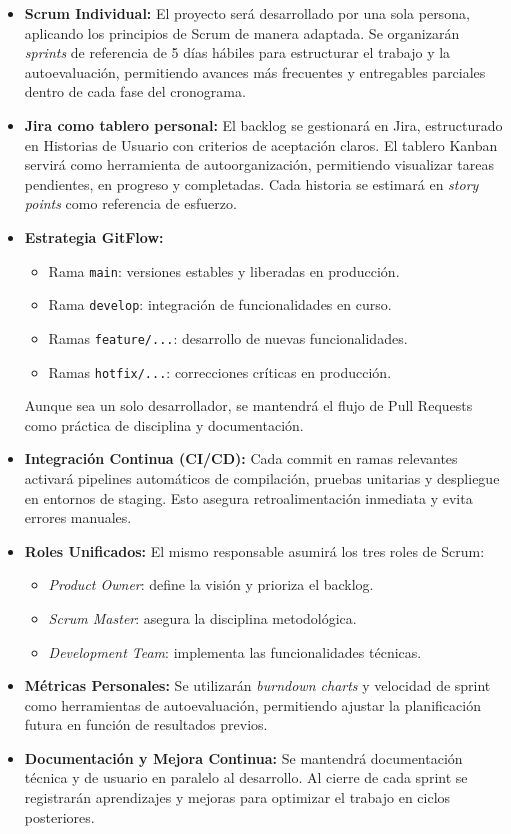 \documentclass[11pt,a4paper]{article}
\begin{document}
	\begin{itemize}
		\item \textbf{Scrum Individual:} El proyecto será desarrollado por una sola persona, aplicando los principios de Scrum de manera adaptada. Se organizarán \textit{sprints} de referencia de 5 días hábiles para estructurar el trabajo y la autoevaluación, permitiendo avances más frecuentes y entregables parciales dentro de cada fase del cronograma.
		
		\item \textbf{Jira como tablero personal:} El backlog se gestionará en Jira, estructurado en Historias de Usuario con criterios de aceptación claros. El tablero Kanban servirá como herramienta de autoorganización, permitiendo visualizar tareas pendientes, en progreso y completadas. Cada historia se estimará en \textit{story points} como referencia de esfuerzo.
		
		\item \textbf{Estrategia GitFlow:} 
		\begin{itemize}
			\item Rama \texttt{main}: versiones estables y liberadas en producción.
			\item Rama \texttt{develop}: integración de funcionalidades en curso.
			\item Ramas \texttt{feature/...}: desarrollo de nuevas funcionalidades.
			\item Ramas \texttt{hotfix/...}: correcciones críticas en producción.
		\end{itemize}
		Aunque sea un solo desarrollador, se mantendrá el flujo de Pull Requests como práctica de disciplina y documentación.
		
		\item \textbf{Integración Continua (CI/CD):} Cada commit en ramas relevantes activará pipelines automáticos de compilación, pruebas unitarias y despliegue en entornos de staging. Esto asegura retroalimentación inmediata y evita errores manuales.
		
		\item \textbf{Roles Unificados:} El mismo responsable asumirá los tres roles de Scrum:
		\begin{itemize}
			\item \textit{Product Owner}: define la visión y prioriza el backlog.
			\item \textit{Scrum Master}: asegura la disciplina metodológica.
			\item \textit{Development Team}: implementa las funcionalidades técnicas.
		\end{itemize}
		
		\item \textbf{Métricas Personales:} Se utilizarán \textit{burndown charts} y velocidad de sprint como herramientas de autoevaluación, permitiendo ajustar la planificación futura en función de resultados previos.
		
		\item \textbf{Documentación y Mejora Continua:} Se mantendrá documentación técnica y de usuario en paralelo al desarrollo. Al cierre de cada sprint se registrarán aprendizajes y mejoras para optimizar el trabajo en ciclos posteriores.
	\end{itemize}
	
\end{document}
